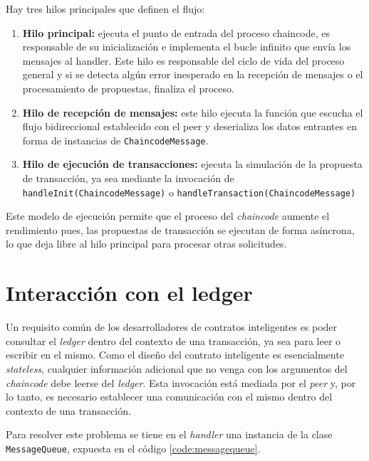 Hay tres hilos principales que definen el flujo:

\begin{enumerate}
\item \textbf{Hilo principal:} ejecuta el punto de entrada del proceso chaincode, es responsable de su inicialización e implementa el bucle infinito que envía los mensajes al handler. Este hilo es responsable del ciclo de vida del proceso general y si se detecta algún error inesperado en la recepción de mensajes o el procesamiento de propuestas, finaliza el proceso.

\item \textbf{Hilo de recepción de mensajes:} este hilo ejecuta la función que escucha el flujo bidireccional establecido con el peer y deserializa los datos entrantes en forma de instancias de \texttt{ChaincodeMessage}. 


\item \textbf{Hilo de ejecución de transacciones:} ejecuta la simulación de la propuesta de transacción, ya sea mediante la invocación de \texttt{handleInit(ChaincodeMessage)} o \texttt{handleTransaction(ChaincodeMessage)}

\end{enumerate}
Este modelo de ejecución permite que el proceso del \textit{chaincode} aumente el rendimiento pues, las propuestas de transacción se ejecutan de forma asíncrona, lo que deja libre al hilo principal para procesar otras solicitudes.

\section{Interacción con el ledger}\label{ledgerinteraction}
Un requisito común de los desarrolladores de contratos inteligentes es poder consultar el \textit{ledger} dentro del contexto de una transacción, ya sea para leer o escribir en el mismo. Como el diseño del contrato inteligente es esencialmente \textit{stateless}, cualquier información adicional que no venga con los argumentos del \textit{chaincode} debe leerse del \textit{ledger}. Esta invocación está mediada por el \textit{peer} y, por lo tanto, es necesario establecer una comunicación con el mismo dentro del contexto de una transacción.

Para resolver este problema se tiene en el \textit{handler} una instancia de la clase \texttt{MessageQueue}, expuesta en el código \ref{code:messagequeue}.

